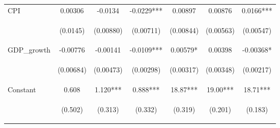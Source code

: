 \documentclass[]{article}
\begin{document}
\begin{center}
\begin{tabular}{lcccccc}
CPI & 0.00306 & -0.0134 & -0.0229*** & 0.00897 & 0.00876 & 0.0166*** \\
\vspace{4pt} & \begin{footnotesize}(0.0145)\end{footnotesize} & \begin{footnotesize}(0.00880)\end{footnotesize} & \begin{footnotesize}(0.00711)\end{footnotesize} & \begin{footnotesize}(0.00844)\end{footnotesize} & \begin{footnotesize}(0.00563)\end{footnotesize} & \begin{footnotesize}(0.00547)\end{footnotesize} \\
GDP\_growth & -0.00776 & -0.00141 & -0.0109*** & 0.00579* & 0.00398 & -0.00368* \\
\vspace{4pt} & \begin{footnotesize}(0.00684)\end{footnotesize} & \begin{footnotesize}(0.00473)\end{footnotesize} & \begin{footnotesize}(0.00298)\end{footnotesize} & \begin{footnotesize}(0.00317)\end{footnotesize} & \begin{footnotesize}(0.00348)\end{footnotesize} & \begin{footnotesize}(0.00217)\end{footnotesize} \\
Constant & 0.608 & 1.120*** & 0.888*** & 18.87*** & 19.00*** & 18.71*** \\
 & \begin{footnotesize}(0.502)\end{footnotesize} & \begin{footnotesize}(0.313)\end{footnotesize} & \begin{footnotesize}(0.332)\end{footnotesize} & \begin{footnotesize}(0.319)\end{footnotesize} & \begin{footnotesize}(0.201)\end{footnotesize} & \begin{footnotesize}(0.183)\end{footnotesize} \\

\end{tabular}
\end{center}
\end{document}
